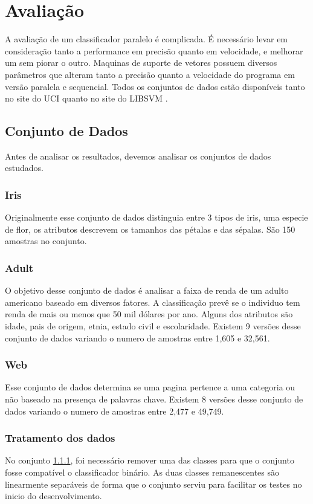 \chapter{Avaliação} \label{chp:LABEL_CHP_5}

A avaliação de um classificador paralelo é complicada. É necessário levar em consideração tanto a performance em precisão quanto em velocidade, e melhorar um sem piorar o outro. Maquinas de suporte de vetores possuem diversos parâmetros que alteram tanto a precisão quanto a velocidade do programa em versão paralela e sequencial. Todos os conjuntos de dados estão disponíveis tanto no site do UCI \cite{UCI} quanto no site do LIBSVM \cite{art:LIBSVM}.

\section{Conjunto de Dados}\label{sec:LABEL_CHP_5_SEC_A}
Antes de analisar os resultados, devemos analisar os conjuntos de dados estudados.
\subsection{Iris} \label{sec:Iris}
Originalmente esse conjunto de dados distinguia entre 3 tipos de iris, uma especie de flor, os atributos descrevem os tamanhos das pétalas e das sépalas. São 150 amostras no conjunto.
\subsection{Adult} \label{sec:Adult}
O objetivo desse conjunto de dados é analisar a faixa de renda de um adulto americano baseado em diversos fatores. A classificação prevê se o individuo tem renda de mais ou menos que 50 mil dólares por ano. Alguns dos atributos são idade, pais de origem, etnia, estado civil e escolaridade. Existem 9 versões desse conjunto de dados variando o numero de amostras entre 1,605 e 32,561.
\subsection{Web} \label{sec:Web}
Esse conjunto de dados determina se uma pagina pertence a uma categoria ou não baseado na presença de palavras chave. Existem 8 versões desse conjunto de dados variando o numero de amostras entre 2,477 e 49,749.

\subsection{Tratamento dos dados}
No conjunto \ref{sec:Iris}, foi necessário remover uma das classes para que o conjunto fosse compatível o classificador binário. As duas classes remanescentes são linearmente separáveis de forma que o conjunto serviu para facilitar os testes no inicio do desenvolvimento.

